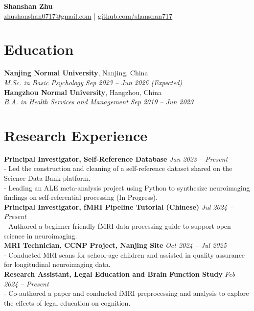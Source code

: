 \documentclass[a4paper,10pt]{article}
\begin{document}
\begin{center}
    \Huge \textbf{Shanshan Zhu} \\[0.5em]
    \small \href{mailto:zhushanshan0717@gmail.com}{zhushanshan0717@gmail.com} | \href{https://github.com/shanshan717}{github.com/shanshan717}
\end{center}

\section*{Education}
\noindent
\textbf{Nanjing Normal University}, Nanjing, China \\
\textit{M.Sc. in Basic Psychology} \hfill \textit{Sep 2023 -- Jun 2026 (Expected)} \\
\vspace{0.3em}
\textbf{Hangzhou Normal University}, Hangzhou, China \\
\textit{B.A. in Health Services and Management} \hfill \textit{Sep 2019 -- Jun 2023}

\section*{Research Experience}
\noindent
\textbf{Principal Investigator, Self-Reference Database} \hfill \textit{Jan 2023 -- Present} \\
- Led the construction and cleaning of a self-reference dataset shared on the Science Data Bank platform. \\
- Leading an ALE meta-analysis project using Python to synthesize neuroimaging findings on self-referential processing (In Progress). \\[0.5em]

\noindent
\textbf{Principal Investigator, fMRI Pipeline Tutorial (Chinese)} \hfill \textit{Jul 2024 -- Present} \\
- Authored a beginner-friendly fMRI data processing guide to support open science in neuroimaging. \\[0.5em]

\noindent
\textbf{MRI Technician, CCNP Project, Nanjing Site} \hfill \textit{Oct 2024 -- Jul 2025} \\
- Conducted MRI scans for school-age children and assisted in quality assurance for longitudinal neuroimaging data. \\[0.5em]

\noindent
\textbf{Research Assistant, Legal Education and Brain Function Study} \hfill \textit{Feb 2024 -- Present} \\
- Co-authored a paper and conducted fMRI preprocessing and analysis to explore the effects of legal education on cognition.
\end{document}

